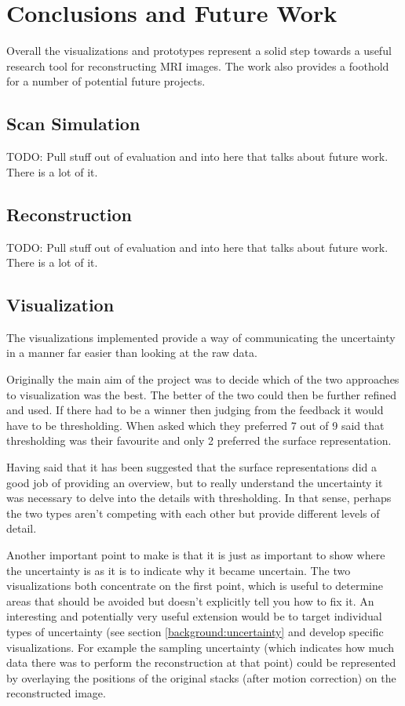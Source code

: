 \chapter{Conclusions and Future Work}
Overall the visualizations and prototypes represent a solid step towards a useful research tool for reconstructing MRI images. The work also provides a foothold for a number of potential future projects.

\section{Scan Simulation}
TODO: Pull stuff out of evaluation and into here that talks about future work. There is a lot of it.

\section{Reconstruction}
TODO: Pull stuff out of evaluation and into here that talks about future work. There is a lot of it.

\section{Visualization}
The visualizations implemented provide a way of communicating the uncertainty in a manner far easier than looking at the raw data.

Originally the main aim of the project was to decide which of the two approaches to visualization was the best. The better of the two could then be further refined and used. If there had to be a winner then judging from the feedback  it would have to be thresholding. When asked which they preferred 7 out of 9 said that thresholding was their favourite and only 2 preferred the surface representation.

Having said that it has been suggested that the surface representations did a good job of providing an overview, but to really understand the uncertainty it was necessary to delve into the details with thresholding. In that sense, perhaps the two types aren't competing with each other but provide different levels of detail.

Another important point to make is that it is just as important to show where the uncertainty is as it is to indicate why it became uncertain. The two visualizations both concentrate on the first point, which is useful to determine areas that should be avoided but doesn't explicitly tell you how to fix it. An interesting and potentially very useful extension would be to target individual types of uncertainty (see section \ref{background:uncertainty} and develop specific visualizations. For example the sampling uncertainty (which indicates how much data there was to perform the reconstruction at that point) could be represented by overlaying the positions of the original stacks (after motion correction) on the reconstructed image.

